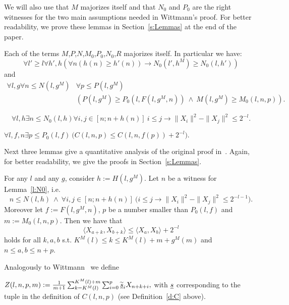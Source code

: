 We will also use that $M$ majorizes itself and that $N_0$ and $P_0$ are the right witnesses for the two main assumptions needed in Wittmann's proof. For better readability, we prove these lemmas in Section~\ref{s:Lemmas} at the end of the paper.

\begin{lemma}[$M$ is a majorant]\label{l:M}
Each of the terms $M$,$P$,$N$,$M_0$,$P_0$,$N_0$,$R$ majorizes itself.
In particular we have:
\[ \forall l'\geq l\forall h',h ( \forall n (h(n)\geq h'(n)) \rightarrow N_0(l',h^M)\geq N_0(l,h') ) \]
and
\begin{align*}
 \forall l,g \forall n\leq N(l,g^M) &\forall p\leq P(l,g^M)\\
  &( P(l,g^M)\geq P_0(l,F(l,g^M,n))\ \wedge\ M(l,g^M)\geq M_0(l,n,p) ) . 
\end{align*}
\end{lemma}

\begin{lemma}[$N_0$ is correct]\label{l:N0}
\[
\forall l,h \exists n \leq N_0(l,h) \forall i,j\in[n;n+h(n)]\ i\leq j\rightarrow \|X_i\|^2-\|X_j\|^2\leq 2^{-l}.
\]
\end{lemma}

\begin{lemma}[$P_0$ is correct]\label{l:P0}
$
\forall l,f,n\exists p\leq P_0(l,f)\ \big( C(l,n,p)\leq C(l,n,f(p)) + 2^{-l} \big).
$
\end{lemma}

Next three lemmas give a quantitative analysis of the original proof in~\cite{Wittmann90}. Again, for better readability, we 
give the proofs in Section~\ref{s:Lemmas}. 

\begin{lemma}\label{l:scpb}
For any $l$ and any $g$, consider $h:= H(l,g^M)$. Let
$n$ be a witness for Lemma~\ref{l:N0}, i.e. 
\[
n\leq N(l,h)\ \wedge\ \forall i,j\in[n;n+h(n)]\ 
\big( i\leq j\rightarrow \|X_i\|^2-\|X_j\|^2\leq 2^{-l-1} \big) . \tag{N}
\]
Moreover let $f:=F(l,g^M,n)$,
$p$ be a number smaller than $P_0(l,f)$ 
and  $m:=M_0(l,n,p)$. Then we have that
\[ 
\langle X_{a+k},X_{b+k} \rangle \leq \langle X_{a},X_{b} \rangle + 2^{-l}
\]
holds for all $k,a,b$ s.t. $K^M(l)\leq k \leq K^M(l)+m+g^M(m)$ and $ n\leq a,b \leq n+p$.
\end{lemma}

Analogously to Wittmann~\cite{Wittmann90} we define
\begin{dfn}[$Z$]\label{d:Z}
$Z(l,n,p,m):=\frac{1}{m+1}\sum^{K^M(l)+m}_{k=K^M(l)}\sum^{p}_{i=0}  \widetilde{\underline s}_i X_{n+k+i},$
with $\underline s$ corresponding to the tuple in the definition of $C(l,n,p)$ (see
Definition~\ref{d:C} above). 
\end{dfn}

